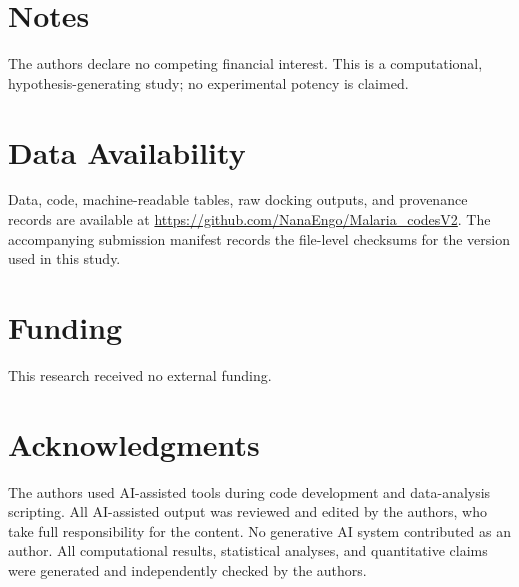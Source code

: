 \documentclass[journal=jcisd8,manuscript=article]{achemso}
\begin{document}
\section*{Notes}
The authors declare no competing financial interest. This is a computational, hypothesis-generating study; no experimental potency is claimed.

\section*{Data Availability}
Data, code, machine-readable tables, raw docking outputs, and provenance records are available at \url{https://github.com/NanaEngo/Malaria_codesV2}. The accompanying submission manifest records the file-level checksums for the version used in this study.

\section*{Funding}
This research received no external funding.

\section*{Acknowledgments}
The authors used AI-assisted tools during code development and data-analysis scripting. All AI-assisted output was reviewed and edited by the authors, who take full responsibility for the content. No generative AI system contributed as an author. All computational results, statistical analyses, and quantitative claims were generated and independently checked by the authors.


\end{document}
